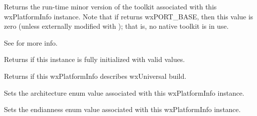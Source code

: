


\label{wxplatforminfogettoolkitminorversion}


Returns the run-time minor version of the toolkit associated with this wxPlatformInfo instance.
Note that if  returns wxPORT\_BASE, then this value is zero (unless externally modified with ); that is, no native toolkit is in use.

See  for more info.






\label{wxplatforminfoisok}


Returns \true if this instance is fully initialized with valid values.



\label{wxplatforminfoisusinguniversalwidgets}


Returns \true if this wxPlatformInfo describes wxUniversal build.


\label{wxplatforminfosetarchitecture}


Sets the architecture enum value associated with this wxPlatformInfo instance.



\label{wxplatforminfosetendianness}


Sets the endianness enum value associated with this wxPlatformInfo instance.


\label{wxplatforminfosetosversion}

